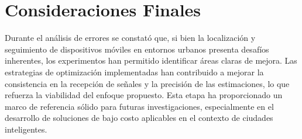 \section{Consideraciones Finales}
Durante el análisis de errores se constató que, si bien la localización y seguimiento de dispositivos móviles en entornos urbanos presenta desafíos inherentes, los experimentos han permitido identificar áreas claras de mejora. Las estrategias de optimización implementadas han contribuido a mejorar la consistencia en la recepción de señales y la precisión de las estimaciones, lo que refuerza la viabilidad del enfoque propuesto. Esta etapa ha proporcionado un marco de referencia sólido para futuras investigaciones, especialmente en el desarrollo de soluciones de bajo costo aplicables en el contexto de ciudades inteligentes.
